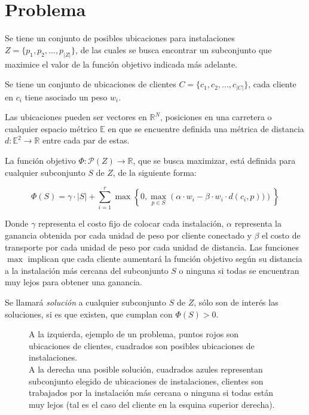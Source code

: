 \section{Problema}



Se tiene un conjunto de posibles ubicaciones para instalaciones $Z = \{p_1,p_2,...,p_{|Z|}\}$, de las cuales se busca encontrar un subconjunto que maximice el valor de la función objetivo indicada más adelante.

Se tiene un conjunto de ubicaciones de clientes $C = \{c_1,c_2,...,c_{|C|}\}$, cada cliente en $c_i$ tiene asociado un peso $w_i$.

Las ubicaciones pueden ser vectores en $\mathbb{R}^N$, posiciones en una carretera o cualquier espacio métrico $\mathbb{E}$ en que se encuentre definida una métrica de distancia $d : \mathbb{E}^2 \rightarrow \mathbb{R}$ entre cada par de estas.

La función objetivo $\Phi : \mathcal{P}(Z) \rightarrow \mathbb{R}$, que se busca maximizar, está definida para cualquier subconjunto $S$ de $Z$, de la siguiente forma:

\begin{equation}
\Phi(S) = \gamma \cdot |S| + \sum_{i=1}^r \max \left\{0 , \max_{p \in S} \left(
    \alpha \cdot w_i - \beta \cdot w_i \cdot d(c_i,p))
\right) \right\}
\end{equation}

Donde $\gamma$ representa el costo fijo de colocar cada instalación, $\alpha$ representa la ganancia obtenida por cada unidad de peso por cliente conectado y $\beta$ el costo de transporte por cada unidad de peso por cada unidad de distancia. Las funciones $\max$ implican que cada cliente aumentará la función objetivo según su distancia a la instalación más cercana del subconjunto $S$ o ninguna si todas se encuentran muy lejos para obtener una ganancia.

Se llamará \emph{solución} a cualquier subconjunto $S$ de $Z$, sólo son de interés las soluciones, si es que existen, que cumplan con $\Phi(S) > 0$.

\begin{figure}%
    \centering
    \qquad \qquad \qquad
    \caption{A la izquierda, ejemplo de un problema, puntos rojos son ubicaciones de clientes, cuadrados son posibles ubicaciones de instalaciones.\\A la derecha una posible solución, cuadrados azules representan subconjunto elegido de ubicaciones de instalaciones, clientes son trabajados por la instalación más cercana o ninguna si todas están muy lejos (tal es el caso del cliente en la esquina superior derecha).}
    \label{fig:algorithm}
\end{figure}

